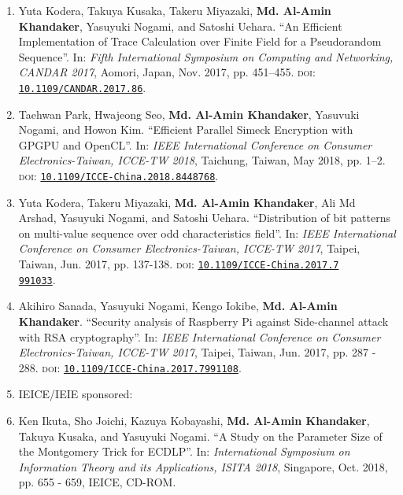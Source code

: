 \documentclass{article}[paper=a4,10pt]
\begin{document}
\begin{enumerate}
	
	\item	Yuta Kodera, Takuya Kusaka, Takeru Miyazaki, \textbf{Md. Al-Amin Khandaker}, Yasuyuki Nogami, and Satoshi Uehara. ``An Efficient Implementation of Trace Calculation over Finite Field for a Pseudorandom Sequence''. In: \textit{Fifth International Symposium on Computing and Networking, CANDAR 2017}, Aomori, Japan, Nov. 2017, pp. 451–455. \textsc{doi}: \href{https://doi.org/10.1109/CANDAR.2017.86}{\texttt{10.1109/CANDAR.2017.86}}.
	
	\item Taehwan Park, Hwajeong Seo, \textbf{Md. Al-Amin Khandaker}, Yasuvuki Nogami, and Howon Kim. ``Efficient Parallel Simeck Encryption with GPGPU and OpenCL''. In: \textit{IEEE International Conference on Consumer Electronics-Taiwan, ICCE-TW 2018}, Taichung, Taiwan, May 2018, pp. 1–2. \textsc{doi}: \href{https://doi.org/10.1109/ICCE-China.2018.8448768}{\texttt{10.1109/ICCE-China.2018.8448768}}.
	
	\item Yuta Kodera, Takeru Miyazaki, \textbf{Md. Al-Amin Khandaker}, Ali Md Arshad, Yasuyuki Nogami, and Satoshi Uehara. ``Distribution of bit patterns on multi-value sequence over odd characteristics field''.  In: \textit{IEEE International Conference on Consumer Electronics-Taiwan, ICCE-TW 2017}, Taipei, Taiwan, Jun. 2017, pp. 137-138. \textsc{doi}: \href{https://doi.org/10.1109/ICCE-China.2017.7991033}{\texttt{10.1109/ICCE-China.2017.7\\991033}}.	
	
	\item Akihiro Sanada, Yasuyuki Nogami, Kengo Iokibe, \textbf{Md. Al-Amin Khandaker}. ``Security analysis of Raspberry Pi against Side-channel attack with RSA cryptography''. In: \textit{IEEE International Conference on Consumer Electronics-Taiwan, ICCE-TW 2017}, Taipei, Taiwan, Jun. 2017, pp. 287 - 288. \textsc{doi}: \href{https://doi.org/10.1109/ICCE-China.2017.7991108}{\texttt{10.1109/ICCE-China.2017.7991108}}.	
	
	\vspace{10mm}
	\item[ ] \Large IEICE/IEIE sponsored:
	\normalsize
	\item Ken Ikuta, Sho Joichi, Kazuya Kobayashi, \textbf{Md. Al-Amin Khandaker}, Takuya Kusaka, and Yasuyuki Nogami. ``A Study on the Parameter Size of the Montgomery Trick for ECDLP''. In: \textit{International Symposium on Information Theory and its Applications, ISITA 2018}, Singapore, Oct. 2018,  pp. 655 - 659,  IEICE, CD-ROM.
	

\end{enumerate}
\end{document}
